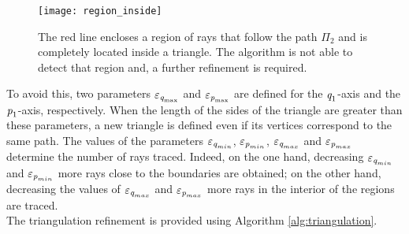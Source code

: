 \begin{figure}[h]
  \begin{center}
  \texttt{[image: region\_inside]}
  \end{center}
  \caption{The red line encloses a region of rays that follow the path $\Pi_2$ and is completely located inside a triangle.
  The algorithm is not able to detect that region and, a further refinement is required.}
   \label{fig:region inside}
  \end{figure}
To avoid this, two parameters $\varepsilon_{\textit{q}_{\textrm{max}}}$ and $\varepsilon_{\textit{p}_{\textrm{max}}}$ are defined for the $\textit{q}_1$-axis and the $\textit{p}_1$-axis, respectively.
When the length of the sides of the triangle are greater than these parameters, a new triangle is defined even if its vertices correspond to the same path.
The values of the parameters $\varepsilon_{\textit{q}_{min}}$, $\varepsilon_{\textit{p}_{min}}$, $\varepsilon_{\textit{q}_{max}}$ and $\varepsilon_{\textit{p}_{max}}$ determine the number of rays traced.
Indeed, on the one hand, decreasing $\varepsilon_{\textit{q}_{min}}$ and $\varepsilon_{\textit{p}_{min}}$ more rays close to the boundaries are obtained;
on the other hand, decreasing the values of $\varepsilon_{\textit{q}_{max}}$ and $\varepsilon_{\textit{p}_{max}}$ more rays in the interior of the regions are traced. %
\\ \indent The triangulation refinement is provided using Algorithm \ref{alg:triangulation}.
 \\ \indent
